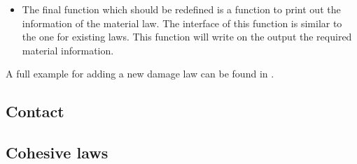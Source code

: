 \begin{itemize}

\item {} The final function which should be redefined is
  a function to print out
  the information of the material law. The interface of this function
  is similar to the one for existing laws. This function will write on
  the output the required material information.
\end{itemize}

  A full example for adding a new damage law can be
  found in .


\subsection{Contact }

\subsection{Cohesive laws}

